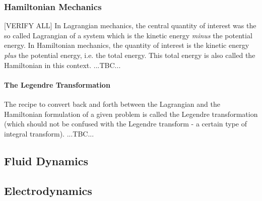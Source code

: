 


%


\subsubsection{Hamiltonian Mechanics} [VERIFY ALL]
In Lagrangian mechanics, the central quantity of interest was the so called Lagrangian of a system which is the kinetic energy \emph{minus} the potential energy. In Hamiltonian mechanics, the quantity of interest is the kinetic energy \emph{plus} the potential energy, i.e. the total energy. This total energy is also called the Hamiltonian in this context. ...TBC...

\paragraph{The Legendre Transformation}
The recipe to convert back and forth between the Lagrangian and the Hamiltonian formulation of a given problem is called the Legendre transformation (which should not be confused with the Legendre transform - a certain type of integral transform). ...TBC...






\subsection{Fluid Dynamics}


\subsection{Electrodynamics}

